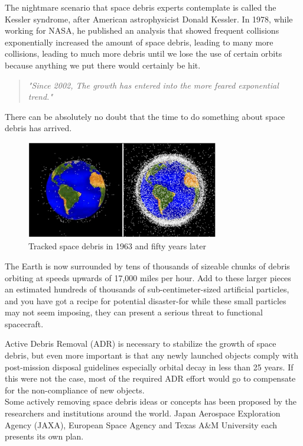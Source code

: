 The nightmare scenario that space debris experts contemplate is called the Kessler syndrome, after American astrophysicist Donald Kessler. In 1978, while working for NASA, he published an analysis\cite{kessler1978collision} that showed frequent collisions exponentially increased the amount of space debris, leading to many more collisions, leading to much more debris until we lose the use of certain orbits because anything we put there would certainly be hit.

\begin{quote}
\em{"Since 2002, The growth has entered into the more feared exponential trend."}
\end{quote}
There can be absolutely no doubt that the time to do something about space debris has arrived.

\begin{figure}[ht]
\centering
\includegraphics[width=0.75\textwidth]{fig/motivation/TrackedSpaceDebris}
\caption{Tracked space debris in 1963 and fifty years later}
\label{moti-TrackedSpaceDebris}
\end{figure}

The Earth is now surrounded by tens of thousands of sizeable chunks of debris orbiting at speeds upwards of 17,000 miles per hour. Add to these larger pieces an estimated hundreds of thousands of sub-centimeter-sized artificial particles, and you have got a recipe for potential disaster-for while these small particles may not seem imposing, they can present a serious threat to functional spacecraft.


Active Debris Removal (ADR) is necessary to stabilize the growth of space debris, but even more important is that any newly launched objects comply with post-mission disposal guidelines especially orbital decay in less than 25 years. If this were not the case, most of the required ADR effort would go to compensate for the non-compliance of new objects.\\

Some actively removing space debris ideas or concepts has been proposed by the researchers and institutions around the world. Japan Aerospace Exploration Agency (JAXA), European Space Agency and Texas A\&M University each presents its own plan.

\newpage

